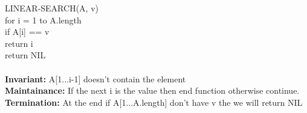 \documentclass{article}
\begin{document}
LINEAR-SEARCH(A, v)\\
\indent for i = 1 to A.length\\
\indent \indent if A[i] == v\\
\indent \indent \indent return i\\
\indent return NIL\\
\\
\textbf{Invariant:} A[1...i-1] doesn't contain the element\\
\textbf{Maintainance:} If the next i is the value then end function otherwise continue.\\
\textbf{Termination:} At the end if A[1...A.length] don't have v the we will return NIL
\end{document}
